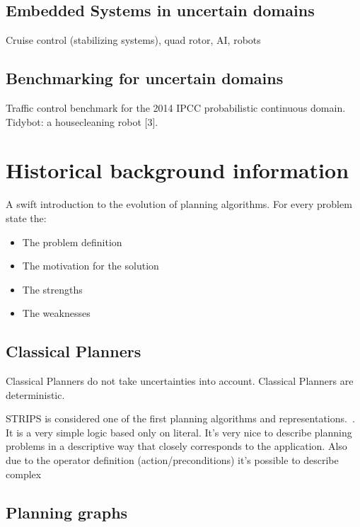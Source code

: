 \documentclass[runningheads,a4paper]{llncs}
\begin{document}
\subsection{Embedded Systems in uncertain domains}

Cruise control (stabilizing systems), quad rotor, AI, robots

\subsection{Benchmarking for uncertain domains}

Traffic control benchmark for the 2014 IPCC probabilistic continuous domain.
Tidybot: a housecleaning robot [3]. \\


\section{Historical background information}
A swift introduction to the evolution of planning algorithms. For every problem state the:
\begin{itemize}
	\item The problem definition
	\item The motivation for the solution
	\item The strengths
	\item The weaknesses
\end{itemize}

\subsection{Classical Planners}

Classical Planners do not take uncertainties into account. Classical Planners
are deterministic.

STRIPS is considered one of the first planning algorithms and
representations.~\cite{lavalle2006planning}. It is a very simple logic based
only on literal. It's very nice to describe planning problems in a
descriptive way that closely corresponds to the application. Also due to the
operator definition (action/preconditions) it's possible to describe complex


\subsection{Planning graphs}
\end{document}

